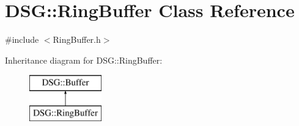 \hypertarget{classDSG_1_1RingBuffer}{\section{D\+S\+G\+:\+:Ring\+Buffer Class Reference}
\label{classDSG_1_1RingBuffer}
}


{\ttfamily \#include $<$Ring\+Buffer.\+h$>$}

Inheritance diagram for D\+S\+G\+:\+:Ring\+Buffer\+:\begin{figure}[H]
\begin{center}
\leavevmode
\includegraphics[height=2.000000cm]{classDSG_1_1RingBuffer}
\end{center}
\end{figure}
